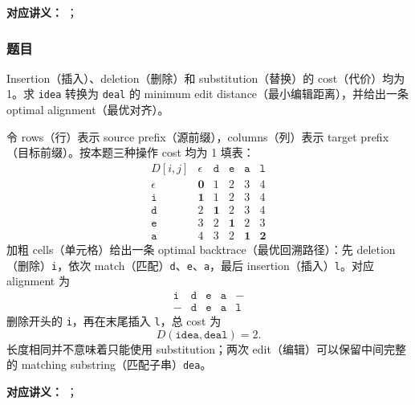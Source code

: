 
\textbf{对应讲义：}
；

\subsubsection*{题目}

Insertion（插入）、deletion（删除）和 substitution（替换）的 cost（代价）均为 1。求 \texttt{idea} 转换为 \texttt{deal} 的 minimum edit distance（最小编辑距离），并给出一条 optimal alignment（最优对齐）。

\begin{checkedsolution}
令 rows（行）表示 source prefix（源前缀），columns（列）表示 target prefix（目标前缀）。按本题三种操作 cost 均为 1 填表：
\[
\begin{array}{c|ccccc}
  D[i,j] & \epsilon & \texttt{d} & \texttt{e} & \texttt{a} & \texttt{l} \\
  \hline
  \epsilon    & \mathbf{0} & 1 & 2 & 3 & 4 \\
  \texttt{i}  & \mathbf{1} & 1 & 2 & 3 & 4 \\
  \texttt{d}  & 2 & \mathbf{1} & 2 & 3 & 4 \\
  \texttt{e}  & 3 & 2 & \mathbf{1} & 2 & 3 \\
  \texttt{a}  & 4 & 3 & 2 & \mathbf{1} & \mathbf{2}
\end{array}
\]
加粗 cells（单元格）给出一条 optimal backtrace（最优回溯路径）：先 deletion（删除）\texttt{i}，依次 match（匹配）\texttt{d}、\texttt{e}、\texttt{a}，最后 insertion（插入）\texttt{l}。对应 alignment 为
\[
\begin{array}{ccccc}
  \texttt{i}&\texttt{d}&\texttt{e}&\texttt{a}&-\\
  -&\texttt{d}&\texttt{e}&\texttt{a}&\texttt{l}
\end{array}
\]
删除开头的 \texttt{i}，再在末尾插入 \texttt{l}，总 cost 为
\[
  \boxed{D(\texttt{idea},\texttt{deal})=2}.
\]
长度相同并不意味着只能使用 substitution；两次 edit（编辑）可以保留中间完整的 matching substring（匹配子串）\texttt{dea}。
\end{checkedsolution}

\clearpage
{}

\textbf{对应讲义：}
；

